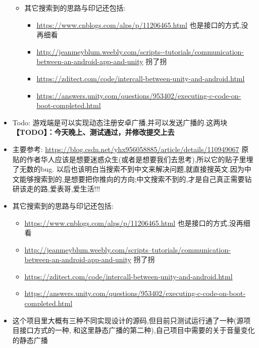 \documentclass[9pt, b5paper]{article}
\begin{document}
\begin{itemize}
\begin{itemize}
\item 其它搜索到的思路与印记还包括:
\begin{itemize}
\item \url{https://www.cnblogs.com/alps/p/11206465.html} 也是接口的方式,没再细看
\item \url{http://jeanmeyblum.weebly.com/scripts--tutorials/communication-between-an-android-app-and-unity} 拐了拐
\item \url{https://zditect.com/code/intercall-between-unity-and-android.html}
\item \url{https://answers.unity.com/questions/953402/executing-c-code-on-boot-completed.html}
\end{itemize}
\end{itemize}
\item Todo: 游戏端是可以实现动态注册安卓广播,并可以发送广播的.这两块 \textbf{【TODO】：今天晚上、测试通过，并修改提交上去}
\item 主要参考: \url{https://blog.csdn.net/yhx956058885/article/details/110949067} 原贴的作者华人应该是想要迷惑众生(或者是想要我们去思考),所以它的贴子里埋了无数的bug. 以后也该明白当搜索不到中文来解决问题,就直接搜英文.因为中文能够搜索到的,是想要把你推向的方向;中文搜索不到的,才是自己真正需要钻研该走的路,爱表哥,爱生活!!!
\item 其它搜索到的思路与印记还包括:
\begin{itemize}
\item \url{https://www.cnblogs.com/alps/p/11206465.html} 也是接口的方式,没再细看
\item \url{http://jeanmeyblum.weebly.com/scripts–tutorials/communication-between-an-android-app-and-unity} 拐了拐
\item \url{https://zditect.com/code/intercall-between-unity-and-android.html}
\item \url{https://answers.unity.com/questions/953402/executing-c-code-on-boot-completed.html}
\end{itemize}
\item 这个项目里大概有三种不同实现设计的源码,但目前只测试运行通了一种(源项目接口方式的一种, 和这里静态广播的第二种),自己项目中需要的关于音量变化的静态广播
\end{itemize}
\end{document}
